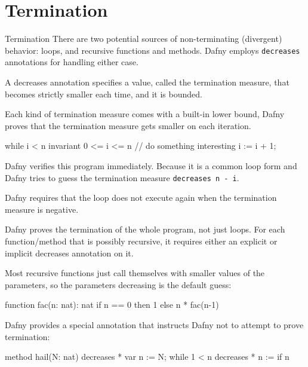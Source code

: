 \documentclass[10pt, compress]{beamer}
\begin{document}
\section{Termination}

\begin{frame}[fragile]{Termination}
There are two potential sources of non-terminating (divergent) behavior: loops, and recursive functions and methods. 
Dafny employs \verb|decreases| annotations for handling either case.

A decreases annotation specifies a value, called the termination measure, that becomes strictly smaller each time, and it is bounded.

Each kind of termination measure comes with a built-in lower bound,
Dafny proves that the termination measure gets smaller on each iteration. 
\end{frame}

\begin{frame}[fragile]
  \begin{verbnobox}[\footnotesize]
while i < n
   invariant 0 <= i <= n
{
   // do something interesting
   i := i + 1;
}
  \end{verbnobox}
Dafny verifies this program immediately. Because it is a common loop form and Dafny tries to guess the termination measure \verb|decreases n - i|.

Dafny requires that the loop does not execute again when the termination measure is negative. 
\end{frame}

\begin{frame}[fragile]
Dafny proves the termination of the whole program, not just loops.
For each function/method that is possibly recursive, it requires either an explicit or implicit decreases annotation on it.

Most recursive functions just call themselves with smaller values of the parameters, so the parameters decreasing is the default guess:
  \begin{verbnobox}[\footnotesize]
function fac(n: nat): nat
{
   if n == 0 then 1 else n * fac(n-1)
}
  \end{verbnobox}
\end{frame}

\begin{frame}[fragile]
Dafny provides a special annotation that instructs Dafny not to attempt to prove termination:
  \begin{verbnobox}[\footnotesize]
method hail(N: nat)
   decreases *
{
   var n := N;
   while 1 < n
      decreases *
   { 
      n := if n %
   }
}
  \end{verbnobox}
\end{frame}
\end{document}
